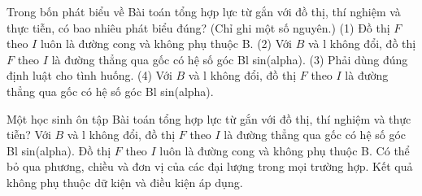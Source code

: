 \begin{ex}
Trong bốn phát biểu về Bài toán tổng hợp lực từ gắn với đồ thị, thí nghiệm và thực tiễn, có bao nhiêu phát biểu đúng? (Chỉ ghi một số nguyên.) (1) Đồ thị $F$ theo $I$ luôn là đường cong và không phụ thuộc B. (2) Với $B$ và l không đổi, đồ thị $F$ theo $I$ là đường thẳng qua gốc có hệ số góc Bl sin(alpha). (3) Phải dùng đúng định luật cho tình huống. (4) Với $B$ và l không đổi, đồ thị $F$ theo $I$ là đường thẳng qua gốc có hệ số góc Bl sin(alpha).
\end{ex}

\begin{ex}
Một học sinh ôn tập Bài toán tổng hợp lực từ gắn với đồ thị, thí nghiệm và thực tiễn?
\choice
{\True Với $B$ và l không đổi, đồ thị $F$ theo $I$ là đường thẳng qua gốc có hệ số góc Bl sin(alpha).}
{Đồ thị $F$ theo $I$ luôn là đường cong và không phụ thuộc B.}
{Có thể bỏ qua phương, chiều và đơn vị của các đại lượng trong mọi trường hợp.}
{Kết quả không phụ thuộc dữ kiện và điều kiện áp dụng.}
\end{ex}

